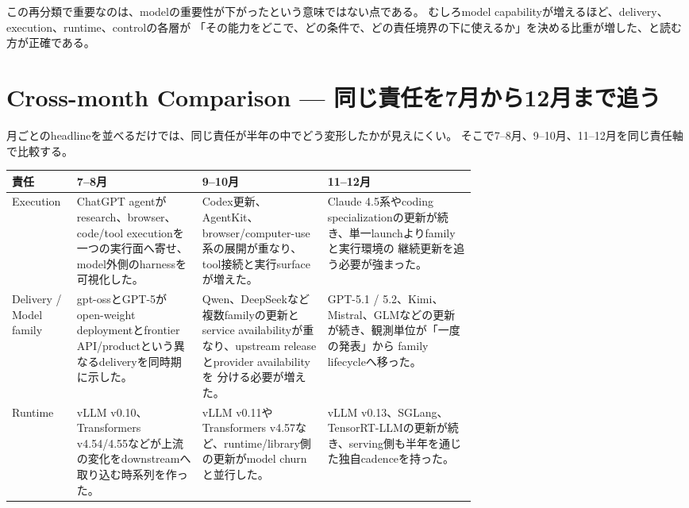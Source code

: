 この再分類で重要なのは、modelの重要性が下がったという意味ではない点である。
むしろmodel capabilityが増えるほど、delivery、execution、runtime、controlの各層が
「その能力をどこで、どの条件で、どの責任境界の下に使えるか」を決める比重が増した、と読む方が正確である。

\Needspace{0.38\textheight}
\section{Cross-month Comparison — 同じ責任を7月から12月まで追う}
\label{analysis:cross-month}

月ごとのheadlineを並べるだけでは、同じ責任が半年の中でどう変形したかが見えにくい。
そこで7--8月、9--10月、11--12月を同じ責任軸で比較する。

\begin{center}
\footnotesize
\renewcommand{\arraystretch}{1.18}
\begin{tabularx}{\linewidth}{@{}p{0.14\linewidth}p{0.27\linewidth}p{0.27\linewidth}X@{}}
\toprule
責任 & 7--8月 & 9--10月 & 11--12月 \\
\midrule
Execution &
ChatGPT agentがresearch、browser、code/tool executionを一つの実行面へ寄せ、
model外側のharnessを可視化した。 \cite{src-b074ccdb2d9e,src-7a7213b68631} &
Codex更新、AgentKit、browser/computer-use系の展開が重なり、tool接続と実行surfaceが増えた。
\cite{src-6deeebce1719,src-0661418088b8,src-a24fd97eb3d0} &
Claude 4.5系やcoding specializationの更新が続き、単一launchよりfamilyと実行環境の
継続更新を追う必要が強まった。 \cite{src-f6aa679babd7,src-55da04f42e32,src-cd8d6c8023f2} \\
Delivery / Model family &
gpt-ossとGPT-5がopen-weight deploymentとfrontier API/productという異なるdeliveryを同時期に示した。
\cite{src-12865e8612c7,src-1c46fdf17c79,src-05738f6c55b7} &
Qwen、DeepSeekなど複数familyの更新とservice availabilityが重なり、upstream releaseとprovider availabilityを
分ける必要が増えた。 \cite{src-eac8dfbeb78c,src-e547d0d8cbe3} &
GPT-5.1 / 5.2、Kimi、Mistral、GLMなどの更新が続き、観測単位が「一度の発表」から
family lifecycleへ移った。 \cite{src-5bea303cfdb1,src-10ab1c39be14,src-9191d43918fc,src-d8b7c1c36830,src-9156c37fb1c2} \\
Runtime &
vLLM v0.10、Transformers v4.54/4.55などが上流の変化をdownstreamへ取り込む時系列を作った。
\cite{src-43eaa2f12960,src-a783d282600b} &
vLLM v0.11やTransformers v4.57など、runtime/library側の更新がmodel churnと並行した。
\cite{src-58ef6e84aa65,src-2595cdd4fabc} &
vLLM v0.13、SGLang、TensorRT-LLMの更新が続き、serving側も半年を通じた独自cadenceを持った。

\end{tabularx}
\end{center}
